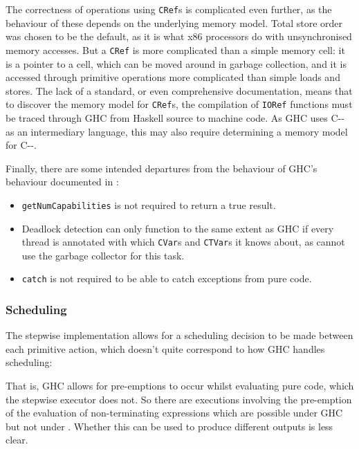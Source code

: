 The correctness of operations using \verb|CRef|s is complicated even
further, as the behaviour of these depends on the underlying memory
model. Total store order was chosen to be the default, as it is what
x86 processors do with unsynchronised memory accesses. But a
\verb|CRef| is more complicated than a simple memory cell: it is a
pointer to a cell, which can be moved around in garbage collection,
and it is accessed through primitive operations more complicated than
simple loads and stores. The lack of a standard, or even comprehensive
documentation, means that to discover the memory model for
\verb|CRef|s, the compilation of \verb|IORef| functions must be traced
through GHC from Haskell source to machine code. As GHC uses C{-}{-}
as an intermediary language, this may also require determining a
memory model for C{-}{-}.

Finally, there are some intended departures from the behaviour of
GHC's behaviour documented in :

\begin{itemize}
\item \verb|getNumCapabilities| is not required to return a true
  result.

\item Deadlock detection can only function to the same extent as GHC
  if every thread is annotated with which \verb|CVar|s and
  \verb|CTVar|s it knows about, as \dejafu{} cannot use the garbage
  collector for this task.

\item \verb|catch| is not required to be able to catch exceptions from
  pure code.
\end{itemize}

\subsubsection{Scheduling}
\label{sec:correctness-execution-scheduling}

The stepwise implementation allows for a scheduling decision to be
made between each primitive action, which doesn't quite correspond to
how GHC handles scheduling:


That is, GHC allows for pre-emptions to occur whilst evaluating pure
code, which the stepwise executor does not. So there are executions
involving the pre-emption of the evaluation of non-terminating
expressions which are possible under GHC but not under
\dejafu{}. Whether this can be used to produce different outputs is
less clear.
